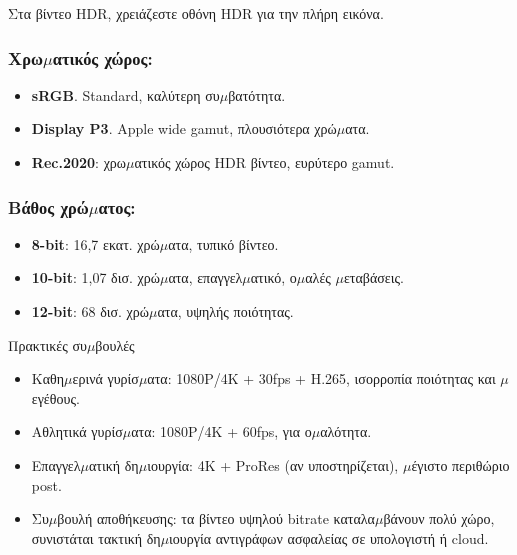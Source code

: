 Στα βίντεο HDR, χρειάζεστε οθόνη HDR για την πλήρη εικόνα.


\subsubsection*{Χρω$\mu$ατικός χώρος:}

\begin{itemize}
  \item \textbf{sRGB}. Standard, καλύτερη συ$\mu$βατότητα.
  \item \textbf{Display P3}. Apple wide gamut, πλουσιότερα χρώ$\mu$ατα.
  \item \textbf{Rec.2020}: χρω$\mu$ατικός χώρος HDR βίντεο, ευρύτερο gamut.
\end{itemize}

\subsubsection*{Βάθος χρώ$\mu$ατος:}

\begin{itemize}
  \item \textbf{8-bit}: 16,7 εκατ. χρώ$\mu$ατα, τυπικό βίντεο.
  \item \textbf{10-bit}: 1,07 δισ. χρώ$\mu$ατα, επαγγελ$\mu$ατικό, ο$\mu$αλές $\mu$εταβάσεις.
  \item \textbf{12-bit}: 68 δισ. χρώ$\mu$ατα, υψηλής ποιότητας.
\end{itemize}

\begin{tcbinfo}{Πρακτικές συ$\mu$βουλές}
\begin{itemize}
  \item Καθη$\mu$ερινά γυρίσ$\mu$ατα: 1080P/4K + 30fps + H.265, ισορροπία ποιότητας και $\mu$εγέθους.
  \item Αθλητικά γυρίσ$\mu$ατα: 1080P/4K + 60fps, για ο$\mu$αλότητα.
  \item Επαγγελ$\mu$ατική δη$\mu$ιουργία: 4K + ProRes (αν υποστηρίζεται), $\mu$έγιστο περιθώριο post.
  \item Συ$\mu$βουλή αποθήκευσης: τα βίντεο υψηλού bitrate καταλα$\mu$βάνουν πολύ χώρο, συνιστάται τακτική δη$\mu$ιουργία αντιγράφων ασφαλείας σε υπολογιστή ή cloud.
\end{itemize}

\end{tcbinfo}


